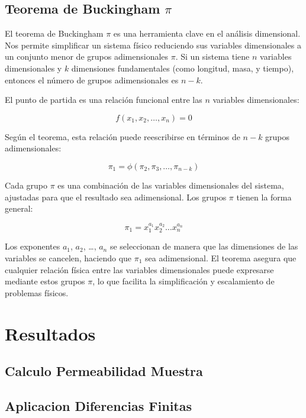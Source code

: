 \subsection{Teorema de Buckingham $\pi$}

El teorema de Buckingham $\pi$ es una herramienta clave en el análisis dimensional. Nos permite simplificar un sistema físico reduciendo sus variables dimensionales a un conjunto menor de grupos adimensionales $\pi$. Si un sistema tiene $n$ variables dimensionales y $k$ dimensiones fundamentales (como longitud, masa, y tiempo), entonces el número de grupos adimensionales es $n - k$.

El punto de partida es una relación funcional entre las $n$ variables dimensionales:

\begin{equation}
f(x_1, x_2, \ldots, x_n) = 0
\end{equation}

Según el teorema, esta relación puede reescribirse en términos de $n - k$ grupos adimensionales:

\begin{equation}
\pi_1 = \phi(\pi_2, \pi_3, \ldots, \pi_{n-k})
\end{equation}

Cada grupo $\pi$ es una combinación de las variables dimensionales del sistema, ajustadas para que el resultado sea adimensional. Los grupos $\pi$ tienen la forma general:

\begin{equation}
\pi_1 = x_1^{a_1} x_2^{a_2} \ldots x_n^{a_n}
\end{equation}

Los exponentes $a_1$, $a_2$, \ldots, $a_n$ se seleccionan de manera que las dimensiones de las variables se cancelen, haciendo que $\pi_1$ sea adimensional. El teorema asegura que cualquier relación física entre las variables dimensionales puede expresarse mediante estos grupos $\pi$, lo que facilita la simplificación y escalamiento de problemas físicos.

\newpage
\section{Resultados}

\subsection{Calculo Permeabilidad Muestra}

\subsection{Aplicacion Diferencias Finitas}

